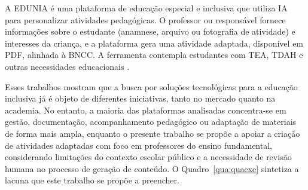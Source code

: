 A EDUNIA é uma plataforma de educação especial e inclusiva que utiliza IA para personalizar atividades pedagógicas. O professor ou responsável fornece informações sobre o estudante (anamnese, arquivo ou fotografia de atividade) e interesses da criança, e a plataforma gera uma atividade adaptada, disponível em PDF, alinhada à BNCC. A ferramenta contempla estudantes com TEA, TDAH e outras necessidades educacionais \cite{edunia2026}.

Esses trabalhos mostram que a busca por soluções tecnológicas para a educação inclusiva já é objeto de diferentes iniciativas, tanto no mercado quanto na academia. No entanto, a maioria das plataformas analisadas concentra-se em gestão, documentação, acompanhamento pedagógico ou adaptação de materiais de forma mais ampla, enquanto o presente trabalho se propõe a apoiar a criação de atividades adaptadas com foco em professores do ensino fundamental, considerando limitações do contexto escolar público e a necessidade de revisão humana no processo de geração de conteúdo. O Quadro~\ref{qua:quaexe} sintetiza a lacuna que este trabalho se propõe a preencher.

